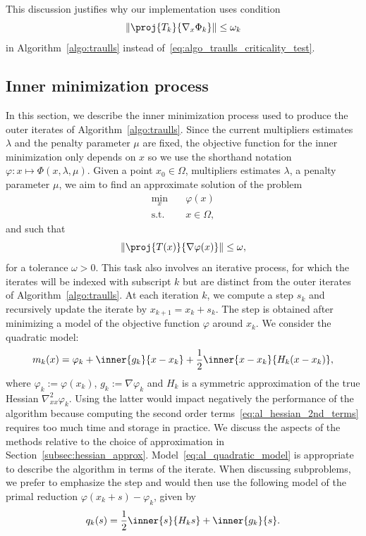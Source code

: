 This discussion justifies why our implementation uses condition
\begin{equation}\label{eq:criticality_cond_reduced_grad}
	\|\proj{T_k}{\nabla_x\Phi_k}\| \le \omega_k
\end{equation}
in Algorithm~\ref{algo:traulls} instead of~\eqref{eq:algo_traulls_criticality_test}.

\subsection{Inner minimization process}\label{sec:inner_iteration}

In this section, we describe the inner minimization process used to produce the outer iterates of Algorithm~\ref{algo:traulls}.
Since the current multipliers estimates $\lambda$ and the penalty parameter $\mu$ are fixed, the objective function for the inner minimization only depends on $x$ so we use the shorthand notation $\varphi : x\mapsto \Phi(x,\lambda,\mu)$.
Given a point $x_0 \in \Omega$, multipliers estimates $\lambda$, a penalty parameter $\mu$, we aim to find an approximate solution of the problem
\begin{equation}\label{eq:inner_itr_subpb}
	\begin{aligned}
		\min_x \quad & \varphi(x)\\
		\text{s.t.} \quad & x \in \Omega,
	\end{aligned}
\end{equation}
and such that
\begin{equation*}
	\|\proj{T(x)}{\nabla \varphi(x)}\| \le \omega,
\end{equation*}
for a tolerance $\omega > 0$. This task also involves an iterative process, for which the iterates will be indexed with subscript $k$ but are distinct from the outer iterates of Algorithm~\ref{algo:traulls}. At each iteration $k$, we compute a step $s_k$ and recursively update the iterate by $x_{k+1}=x_k+s_k$. The step is obtained after minimizing a model of the objective function $\varphi$ around $x_k$. We consider the quadratic model:
\begin{equation}\label{eq:al_quadratic_model}
	m_k(x) = \varphi_k + \inner{g_k}{x-x_k} + \dfrac{1}{2}\inner{x-x_k}{H_k(x-x_k)},
\end{equation}
where $\varphi_k:=\varphi(x_k)$, $g_k:=\nabla \varphi_k$ and $H_k$ is a symmetric approximation of the true Hessian $\nabla^2_{xx} \varphi_k$. Using the latter would impact negatively the performance of the algorithm because computing the second order terms~\eqref{eq:al_hessian_2nd_terms} requires too much time and storage in practice. We discuss the aspects of the methods relative to the choice of approximation in Section~\ref{subsec:hessian_approx}. 
Model~\eqref{eq:al_quadratic_model} is appropriate to describe the algorithm in terms of the iterate. When discussing subproblems, we prefer to emphasize the step and would then use the following model of the primal reduction $\varphi(x_k+s)-\varphi_k$, given by
\begin{equation*}
	q_k(s) = \dfrac{1}{2}\inner{s}{H_ks} + \inner{g_k}{s}.
\end{equation*}

